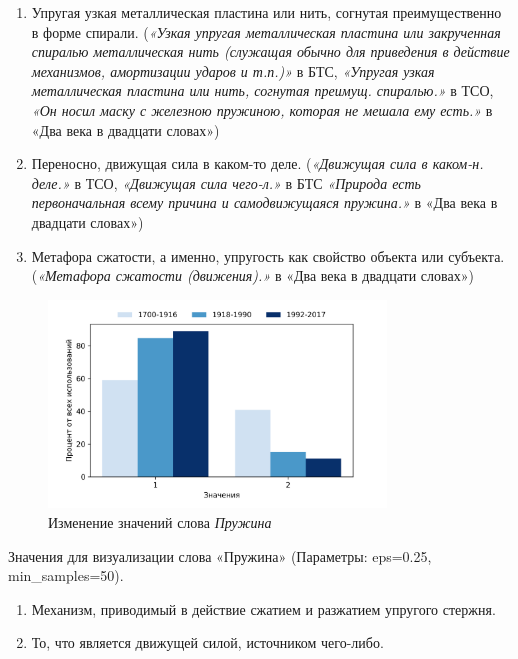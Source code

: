 \begin{enumerate}
    \item Упругая узкая металлическая пластина или нить, согнутая преимущественно в форме спирали.
(\textit{«Узкая упругая металлическая пластина или закрученная спиралью металлическая нить
(служащая обычно для приведения в действие механизмов, амортизации ударов и т.п.)»} в БТС,
\textit{«Упругая узкая металлическая пластина или нить, согнутая преимущ. спиралью.»} в ТСО,
\textit{«Он носил маску с железною пружиною, которая не мешала ему есть.»} в «Два века в двадцати словах»)

    \item Переносно, движущая сила в каком-то деле.
(\textit{«Движущая сила в каком-н. деле.»} в ТСО, \textit{«Движущая сила чего-л.»} в БТС
\textit{«Природа есть первоначальная всему причина и самодвижущаяся пружина.»} в «Два века в двадцати словах»)

    \item Метафора сжатости, а именно, упругость как свойство объекта или субъекта.
(\textit{«Метафора сжатости (движения).»} в «Два века в двадцати словах»)
\end{enumerate}

\begin{figure}[H]
	\centering
	\includegraphics[width=0.8\textwidth]{img/visualizations/pruzhina_minimal}
	\caption{Изменение значений слова \textit{Пружина}}
	\label{fig:Пружина}
\end{figure}

Значения для визуализации слова «Пружина» (Параметры: eps=0.25, min\_samples=50).

\begin{enumerate}
    \item Механизм, приводимый в действие сжатием и разжатием упругого стержня.
    \item То, что является движущей силой, источником чего-либо.
\end{enumerate}

